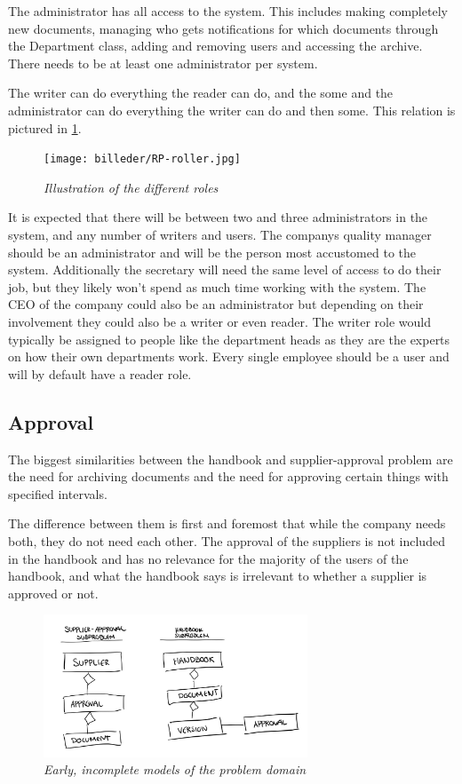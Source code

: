The administrator has all access to the system. 
This includes making completely new documents, managing who gets notifications for which documents through the Department class, adding and removing users and accessing the archive.
There needs to be at least one administrator per system.

The writer can do everything the reader can do, and the some and the administrator can do everything the writer can do and then some. 
This relation is pictured in \cref{fig:RoleIllustration}.

\begin{figure}[H]
	\centering
	\texttt{[image: billeder/RP-roller.jpg]}
	\caption{\textit{Illustration of the different roles
	}}
	\label{fig:RoleIllustration}
\end{figure}

It is expected that there will be between two and three administrators in the system, and any number of writers and users. 
The companys quality manager should be an administrator and will be the person most accustomed to the system. 
Additionally the secretary will need the same level of access to do their job, but they likely won't spend as much time working with the system. 
The CEO of the company could also be an administrator but depending on their involvement they could also be a writer or even reader.
The writer role would typically be assigned to people like the department heads as they are the experts on how their own departments work.
Every single employee should be a user and will by default have a reader role. 

\subsection{Approval}
The biggest similarities between the handbook and supplier-approval problem are the need for archiving documents and the need for approving certain things with specified intervals.

The difference between them is first and foremost that while the company needs both, they do not need each other.
The approval of the suppliers is not included in the handbook and has no relevance for the majority of the users of the handbook, and what the handbook says is irrelevant to whether a supplier is approved or not.

\begin{figure}[H]
	\centering
	\includegraphics[width=0.7\textwidth]{billeder/pseudoClassDiagram.jpg}
	\caption{\textit{Early, incomplete models of the problem domain
	}}
	\label{fig:PseudoClassDiagram}
\end{figure}

